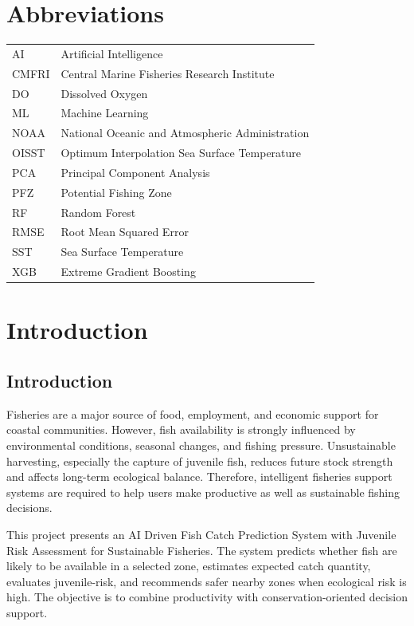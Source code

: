 \documentclass[12pt,a4paper]{report}
\begin{document}
\chapter*{Abbreviations}
\begin{longtable}{p{} p{}}
AI & Artificial Intelligence \\
CMFRI & Central Marine Fisheries Research Institute \\
DO & Dissolved Oxygen \\
ML & Machine Learning \\
NOAA & National Oceanic and Atmospheric Administration \\
OISST & Optimum Interpolation Sea Surface Temperature \\
PCA & Principal Component Analysis \\
PFZ & Potential Fishing Zone \\
RF & Random Forest \\
RMSE & Root Mean Squared Error \\
SST & Sea Surface Temperature \\
XGB & Extreme Gradient Boosting \\
\end{longtable}

\chapter{Introduction}

\section{Introduction}
Fisheries are a major source of food, employment, and economic support for coastal communities. However, fish availability is strongly influenced by environmental conditions, seasonal changes, and fishing pressure. Unsustainable harvesting, especially the capture of juvenile fish, reduces future stock strength and affects long-term ecological balance. Therefore, intelligent fisheries support systems are required to help users make productive as well as sustainable fishing decisions.

This project presents an AI Driven Fish Catch Prediction System with Juvenile Risk Assessment for Sustainable Fisheries. The system predicts whether fish are likely to be available in a selected zone, estimates expected catch quantity, evaluates juvenile-risk, and recommends safer nearby zones when ecological risk is high. The objective is to combine productivity with conservation-oriented decision support.
\end{document}
